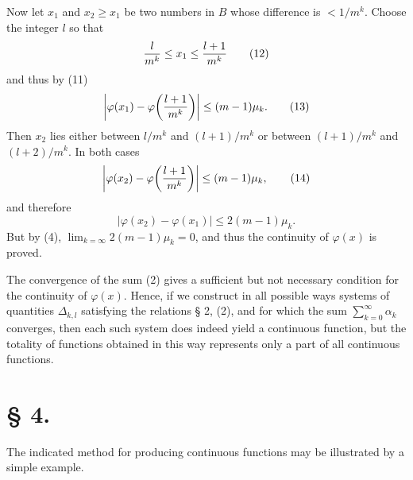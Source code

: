 \documentclass[11pt,a4paper]{article}
\begin{document}
Now let $x_1$ and $x_2\ge x_1$ be two numbers in $B$ whose difference is $<1/m^k$. Choose the integer $l$ so that
\begin{equation}
 {l\over m^k}\le x_1\le {l+1\over m^k}
\tag{12}
\end{equation}
and thus by (11)
\begin{equation}
 \left|\varphi(x_1)-\varphi\!\left({l+1\over m^k}\right)\right|\le(m-1)\mu_k.
\tag{13}
\end{equation}
Then $x_2$ lies either between $l/m^k$ and $(l+1)/m^k$ or between $(l+1)/m^k$ and $(l+2)/m^k$. In both cases
\begin{equation}
 \left|\varphi(x_2)-\varphi\!\left({l+1\over m^k}\right)\right|\le(m-1)\mu_k,
\tag{14}
\end{equation}
and therefore
\begin{equation}
 |\varphi(x_2)-\varphi(x_1)|\le2(m-1)\mu_k.
\tag{14'}
\end{equation}
But by (4), $\lim_{k=\infty}2(m-1)\mu_k=0$, and thus the continuity of $\varphi(x)$ is proved.

The convergence of the sum (2) gives a sufficient but not necessary condition for the continuity of $\varphi(x)$. Hence, if we construct in all possible ways systems of quantities $\Delta_{k,l}$ satisfying the relations § 2, (2), and for which the sum $\sum_{k=0}^{\infty}\alpha_k$ converges, then each such system does indeed yield a continuous function, but the totality of functions obtained in this way represents only a part of all continuous functions.

\section*{§ 4.}

The indicated method for producing continuous functions may be illustrated by a simple example.
\end{document}
